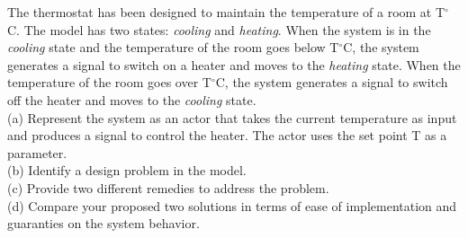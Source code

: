 \documentclass[a4paper, 12pt]{article}
\begin{document}
\begin{problem}{}
The thermostat has been designed to maintain the temperature of a room at T$^{\circ}$C.
The model has two states: \textit{cooling} and \textit{heating}.
When the system is in the \textit{cooling} state and the temperature of the room goes below T$^{\circ}$C, the system
generates a signal to switch on a heater and moves to the \textit{heating} state. 
When the temperature of the room goes over T$^{\circ}$C, the system generates a signal to switch off the heater and moves to
the \textit{cooling} state.\\
(a) Represent the system as an actor that takes the current temperature as input and produces a signal to control the heater. The actor uses the set point T as a parameter.\\
(b) Identify a design problem in the model.\\
(c) Provide two different remedies to address the problem. \\
(d) Compare your proposed two solutions in terms of ease of implementation and guaranties on the system behavior.  \\\\
\\
\begin{minipage}{1\textwidth}
		\rectangle{\linewidth}{16cm}
\end{minipage}
\newpage
\ \\
\begin{minipage}{1\textwidth}
		\rectangle{\linewidth}{24cm}
\end{minipage}
\newpage
\ \\
\begin{minipage}{1\textwidth}
		\rectangle{\linewidth}{24cm}
\end{minipage}
\newpage
\ \\
\begin{minipage}{1\textwidth}
		\rectangle{\linewidth}{24cm}
\end{minipage}
\end{problem}
\newpage


\end{document}
